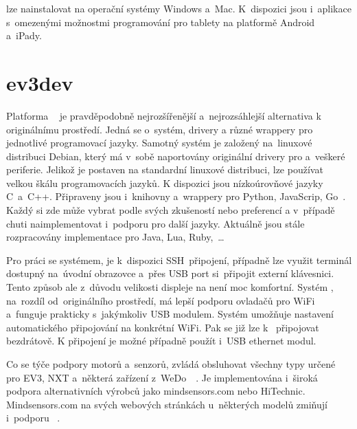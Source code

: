 \legoSW{} lze nainstalovat na operační systémy Windows a~Mac. K~dispozici jsou i~aplikace s~omezenými možnostmi programování pro tablety na platformě Android a~iPady.


\section{ev3dev}
\label{lego-ev3dev}

Platforma \evThreeDev{}~\cite{legoMindstormsEV3_ev3dev} je pravděpodobně nejrozšířenější a~nejrozsáhlejší alternativa k originálnímu \lego{} prostředí.
Jedná se o~systém, drivery a různé wrappery pro jednotlivé programovací jazyky. 
Samotný systém je založený na~linuxové distribuci Debian, který má v~sobě naportovány originální \lego{} drivery pro \EVbrick{} a~veškeré periferie.
% 
% 
%
%
Jelikož je \evThreeDev{} postaven na standardní linuxové distribuci, lze používat velkou škálu programovacích jazyků. 
K dispozici jsou nízkoúrovňové jazyky C~a~C++. 
Připraveny jsou i~knihovny a~wrappery pro Python, JavaScrip, Go~\cite{legoMindstormsEV3_ev3dev-prog-lang}. 
Každý si zde může vybrat podle svých zkušeností nebo preferencí a v~případě chuti naimplementovat i~podporu pro další jazyky. 
Aktuálně jsou stále rozpracovány implementace pro Java, Lua, Ruby,~\dots

Pro práci se systémem, je k~dispozici SSH~připojení, případně lze využit terminál dostupný na~úvodní obrazovce a~přes USB port si~připojit externí klávesnici. 
Tento způsob ale z~důvodu velikosti displeje na  není moc komfortní. 
Systém \evThreeDev{}, na~rozdíl od~originálního \lego{} prostředí, má lepší podporu ovladačů pro WiFi a~funguje prakticky s~jakýmkoliv USB modulem. 
Systém umožňuje nastavení automatického připojování na konkrétní WiFi. Pak se již lze k~ připojovat bezdrátově.
K připojení je možné případně použít i~USB ethernet modul.
 
Co se týče podpory \lego{} motorů a~senzorů, \evThreeDev{} zvládá obsluhovat všechny typy určené pro EV3, NXT a~některá zařízení z~WeDo~\cite{legoMindstormsEV3_ev3dev-support-motors}~\cite{legoMindstormsEV3_ev3dev-support-sensors}.
Je implementována i~široká podpora alternativních výrobců jako mindsensors.com nebo HiTechnic. 
Mindsensors.com na svých webových stránkách u~některých modelů zmiňují i~podporu \evThreeDev{}~\cite{lego_mindsensor_gyro}.  


